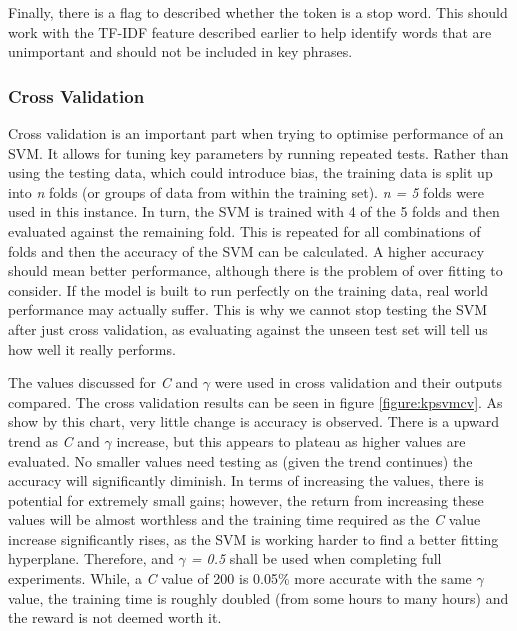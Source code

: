 Finally, there is a flag to described whether the token is a stop word. This should work with the TF-IDF feature described earlier to help identify words that are unimportant and should not be included in key phrases.

\subsubsection*{Cross Validation}
Cross validation is an important part when trying to optimise performance of an SVM. It allows for tuning key parameters by running repeated tests. Rather than using the testing data, which could introduce bias, the training data is split up into \textit{n} folds (or groups of data from within the training set). \textit{n = 5} folds were used in this instance. In turn, the SVM is trained with 4 of the 5 folds and then evaluated against the remaining fold. This is repeated for all combinations of folds and then the accuracy of the SVM can be calculated. A higher accuracy should mean better performance, although there is the problem of over fitting to consider. If the model is built to run perfectly on the training data, real world performance may actually suffer. This is why we cannot stop testing the SVM after just cross validation, as evaluating against the unseen test set will tell us how well it really performs. 

The values discussed for \textit{C} and $\gamma$ were used in cross validation and their outputs compared. The cross validation results can be seen in figure \ref{figure:kpsvmcv}. As show by this chart, very little change is accuracy is observed. There is a upward trend as \textit{C} and $\gamma$ increase, but this appears to plateau as higher values are evaluated. No smaller values need testing as (given the trend continues) the accuracy will significantly diminish. In terms of increasing the values, there is potential for extremely small gains; however, the return from increasing these values will be almost worthless and the training time required as the \textit{C} value increase significantly rises, as the SVM is working harder to find a better fitting hyperplane. Therefore,  and \textit{$\gamma$ = 0.5} shall be used when completing full experiments. While, a \textit{C} value of 200 is 0.05\% more accurate with the same $\gamma$ value, the training time is roughly doubled (from some hours to many hours) and the reward is not deemed worth it.

